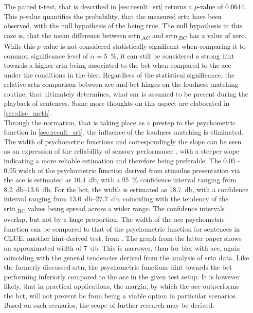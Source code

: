 The paired t-test, that is described in \autoref{sec:result_srt} returns a $p$-value of 0.0644. This $p$-value quantifies the probability, that the measured \gls{srtn} have been observed, with the null hypothesis of the being true. The null hypothesis in this case is, that the mean difference between \gls{srtn}\textsubscript{,AC} and \gls{srtn}\textsubscript{,BC} has a value of zero. 
While this $p$-value is not considered statistically significant when comparing it to common significance level of $\alpha=$\SI{5}{\percent}, it can still be considered a strong hint towards a higher \gls{srtn}  being associated to the \gls{bct} when compared to the \gls{ace} under the conditions in the \gls{bier}.
Regardless of the statistical significance, the relative \gls{srtn} comparison between \gls{ace} and \gls{bct} hinges on the loudness matching routine, that ultimately determines, what \gls{snr} is assumed to be present during the playback of sentences.
Some more thoughts on this aspect are elaborated in \autoref{sec:disc_meth}.\\
Through the normation, that is taking place as a prestep to the psychometric function in \autoref{sec:result_srt}, the influence of the loudness matching is eliminated.
The width of psychometric functions and correspondingly the slope can be seen as an expression of the reliability of sensory performance \citep{strasburger_01}, with a steeper slope indicating a more reliable estimation and therefore being preferable.
The 0.05 - 0.95 width of the psychometric function derived from stimulus presentation via the \gls{ace} is estimated as \SI{10.4}{\decibel}, with a \SI{95}{\percent} confidence interval ranging from \SIrange{8.2}{13.6}{\decibel}. For the \gls{bct}, the width is estimated as \SI{18.7}{\decibel}, with a confidence interval ranging from \SIrange{13.0}{27.7}{\decibel}, coinciding with the tendency of the \gls{srtn}\textsubscript{,BC} values being spread across a wider range. The confidence intervals overlap, but not by a huge proportion. 
The width of the \gls{ace} psychometric function can be compared to that of the psychometric function for sentences in CLUE, another \gls{hint}-derived test, from \citep{nielsen_dau_09}. The graph from the latter paper shows an approximated width of \SI{7}{\decibel}. This is narrower, than for \gls{bier} with \gls{ace}, again coinciding with the general tendencies derived from the analysis of \gls{srtn} data.
Like the formerly discussed \gls{srtn}, the psychometric functions hint towards the \gls{bct} performing inferiorly compared to the \gls{ace} in the given test setup.
It is however likely, that in practical applications, the margin, by which the \gls{ace} outperforms the \gls{bct}, will not prevent \gls{bc} from being a viable option in particular scenarios.
Based on such scenarios, the scope of further research may be derived. 
 


